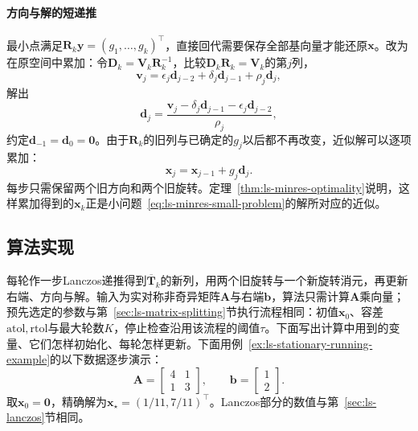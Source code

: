 \paragraph{方向与解的短递推}
最小点满足$\bm R_k\bm y=(g_1,\ldots,g_k)^\top$，直接回代需要保存全部基向量才能还原$\bm x$。改为在原空间中累加：令$\bm D_k=\bm V_k\bm R_k^{-1}$，比较$\bm D_k\bm R_k=\bm V_k$的第$j$列，
\[
 \bm v_j=\epsilon_j\bm d_{j-2}+\delta_j\bm d_{j-1}+\rho_j\bm d_j ,
\]
解出
\begin{equation}
 \bm d_j=\frac{\bm v_j-\delta_j\bm d_{j-1}-\epsilon_j\bm d_{j-2}}{\rho_j} ,
 \label{eq:ls-minres-direction}
\end{equation}
约定$\bm d_{-1}=\bm d_0=\bm 0$。由于$\bm R_k$的旧列与已确定的$g_j$以后都不再改变，近似解可以逐项累加：
\begin{equation}
 \bm x_j=\bm x_{j-1}+g_j\bm d_j .
 \label{eq:ls-minres-update}
\end{equation}
每步只需保留两个旧方向和两个旧旋转。定理~\ref{thm:ls-minres-optimality}说明，这样累加得到的$\bm x_k$正是小问题~\eqref{eq:ls-minres-small-problem}的解所对应的近似。

\subsection{算法实现}

每轮作一步Lanczos递推得到$\overline{\bm T}_k$的新列，用两个旧旋转与一个新旋转消元，再更新右端、方向与解。输入为实对称非奇异矩阵$\bm A$与右端$\bm b$，算法只需计算$\bm A$乘向量；预先选定的参数与第~\ref{sec:ls-matrix-splitting}节执行流程相同：初值$\bm x_0$、容差$\mathrm{atol},\mathrm{rtol}$与最大轮数$K$，停止检查沿用该流程的阈值$\tau$。下面写出计算中用到的变量、它们怎样初始化、每轮怎样更新。下面用例~\ref{ex:ls-stationary-running-example}的以下数据逐步演示：
\[
 \bm A=\begin{bmatrix}4&1\\1&3\end{bmatrix},\qquad \bm b=\begin{bmatrix}1\\2\end{bmatrix}.
\]
取$\bm x_0=\bm 0$，精确解为$\bm x_\star=(1/11,7/11)^\top$。Lanczos部分的数值与第~\ref{sec:ls-lanczos}节相同。

